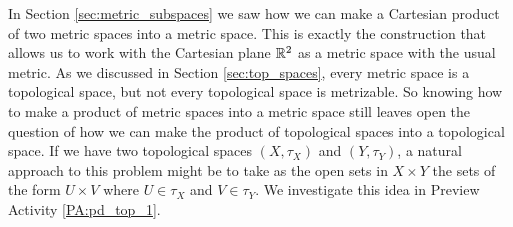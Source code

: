 \label{sec:Product_topology}


\vspace*{-17 pt}

\vspace*{13 pt}

In Section \ref{sec:metric_subspaces} we saw how we can make a Cartesian product of two metric spaces into a metric space. This is exactly the construction that allows us to work with the Cartesian plane $\mathbb{R}^2$ as a metric space with the usual metric. As we discussed in Section \ref{sec:top_spaces}, every metric space is a topological space, but not every topological space is metrizable. So knowing how to make a product of metric spaces into a metric space still leaves open the question of how we can make the product of topological spaces into a topological space. If we have two topological spaces $(X, \tau_X)$ and $(Y , \tau_Y)$, a natural approach to this problem might be to take as the open sets in $X \times Y$ the sets of the form $U \times V$ where $U \in \tau_X$  and $V \in \tau_Y$. We investigate this idea in Preview Activity \ref{PA:pd_top_1}.

